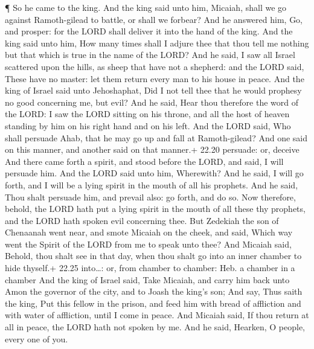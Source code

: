  ¶ So he came to the king. And the king said unto him,
Micaiah, shall we go against Ramoth-gilead to battle, or shall we
forbear? And he answered him, Go, and prosper: for the LORD shall
deliver it into the hand of the king.  And the king said
unto him, How many times shall I adjure thee that thou tell me nothing
but that which is true in the name of the LORD?  And he
said, I saw all Israel scattered upon the hills, as sheep that have not
a shepherd: and the LORD said, These have no master: let them return
every man to his house in peace.  And the king of Israel
said unto Jehoshaphat, Did I not tell thee that he would prophesy no
good concerning me, but evil?  And he said, Hear thou
therefore the word of the LORD: I saw the LORD sitting on his throne,
and all the host of heaven standing by him on his right hand and on his
left.  And the LORD said, Who shall persuade Ahab, that he
may go up and fall at Ramoth-gilead? And one said on this manner, and
another said on that manner.+ 22.20 persuade: or, deceive 
And there came forth a spirit, and stood before the LORD, and said, I
will persuade him.  And the LORD said unto him, Wherewith?
And he said, I will go forth, and I will be a lying spirit in the mouth
of all his prophets. And he said, Thou shalt persuade him, and prevail
also: go forth, and do so.  Now therefore, behold, the LORD
hath put a lying spirit in the mouth of all these thy prophets, and the
LORD hath spoken evil concerning thee.  But Zedekiah the
son of Chenaanah went near, and smote Micaiah on the cheek, and said,
Which way went the Spirit of the LORD from me to speak unto thee?
 And Micaiah said, Behold, thou shalt see in that day, when
thou shalt go into an inner chamber to hide thyself.+ 22.25 into\ldots:
or, from chamber to chamber: Heb. a chamber in a chamber 
And the king of Israel said, Take Micaiah, and carry him back unto Amon
the governor of the city, and to Joash the king's son;  And
say, Thus saith the king, Put this fellow in the prison, and feed him
with bread of affliction and with water of affliction, until I come in
peace.  And Micaiah said, If thou return at all in peace,
the LORD hath not spoken by me. And he said, Hearken, O people, every
one of you.

